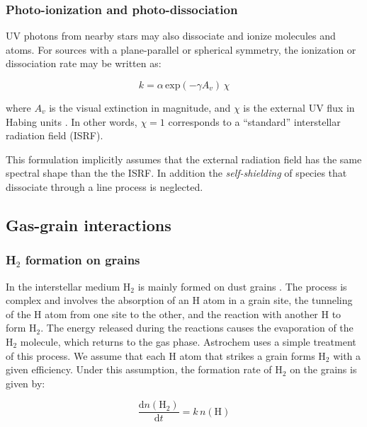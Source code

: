 \documentclass[a4paper,12pt]{article}
\newcommand{\conc}[1]{n(\mathrm{#1})}
\begin{document}
\subsubsection{Photo-ionization and photo-dissociation}
\label{sec:photo-ioniz-photo}

UV photons from nearby stars may also dissociate and ionize molecules
and atoms. For sources with a plane-parallel or spherical symmetry,
the ionization or dissociation rate may be written as:

\begin{equation}
  k = \alpha \, \mathrm{exp} \left( -\gamma A_{v} \right) \, \chi
  \label{eq:photo-ionization}
\end{equation}

\noindent
where $A_{v}$ is the visual extinction in magnitude, and $\chi$ is the
external UV flux in Habing units \citep{Habing68}. In other words,
$\chi = 1$ corresponds to a ``standard'' interstellar radiation field
(ISRF).

This formulation implicitly assumes that the external radiation field
has the same spectral shape than the the ISRF. In addition the
\emph{self-shielding} of species that dissociate through a line
process \citep[e.g. CO;][]{vanDishoeck86} is neglected.

\subsection{Gas-grain interactions}
\label{sec:gas-grain-inter}

\subsubsection{H$_{2}$ formation on grains}
\label{sec:h_2-formation-grains}

In the interstellar medium H$_{2}$ is mainly formed on dust grains
\citep{Hollenbach71}. The process is complex and involves the
absorption of an H atom in a grain site, the tunneling of the H atom
from one site to the other, and the reaction with another H to form
H$_{2}$. The energy released during the reactions causes the
evaporation of the H$_{2}$ molecule, which returns to the gas
phase. Astrochem uses a simple treatment of this process.  We assume
that each H atom that strikes a grain forms H$_{2}$ with a given
efficiency. Under this assumption, the formation rate of H$_{2}$ on
the grains is given by:

\begin{equation}
  \frac{\mathrm{d} \conc{H_{2}}}{\mathrm{d} t} = k \, \conc{H}
  \label{eq:h2-formation-rate}
\end{equation}
\end{document}

